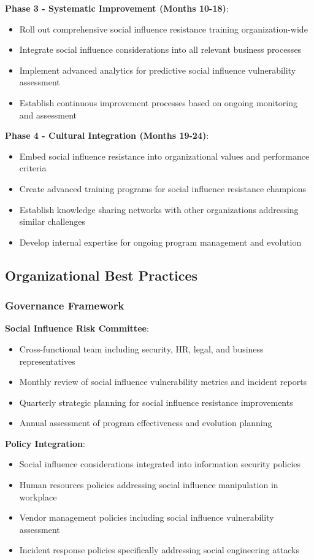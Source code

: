 \documentclass[11pt,a4paper]{article}
\begin{document}
\textbf{Phase 3 - Systematic Improvement (Months 10-18)}:
\begin{itemize}
\item Roll out comprehensive social influence resistance training organization-wide
\item Integrate social influence considerations into all relevant business processes
\item Implement advanced analytics for predictive social influence vulnerability assessment
\item Establish continuous improvement processes based on ongoing monitoring and assessment
\end{itemize}

\textbf{Phase 4 - Cultural Integration (Months 19-24)}:
\begin{itemize}
\item Embed social influence resistance into organizational values and performance criteria
\item Create advanced training programs for social influence resistance champions
\item Establish knowledge sharing networks with other organizations addressing similar challenges
\item Develop internal expertise for ongoing program management and evolution
\end{itemize}

\subsection{Organizational Best Practices}

\subsubsection{Governance Framework}

\textbf{Social Influence Risk Committee}:
\begin{itemize}
\item Cross-functional team including security, HR, legal, and business representatives
\item Monthly review of social influence vulnerability metrics and incident reports
\item Quarterly strategic planning for social influence resistance improvements
\item Annual assessment of program effectiveness and evolution planning
\end{itemize}

\textbf{Policy Integration}:
\begin{itemize}
\item Social influence considerations integrated into information security policies
\item Human resources policies addressing social influence manipulation in workplace
\item Vendor management policies including social influence vulnerability assessment
\item Incident response policies specifically addressing social engineering attacks
\end{itemize}
\end{document}
